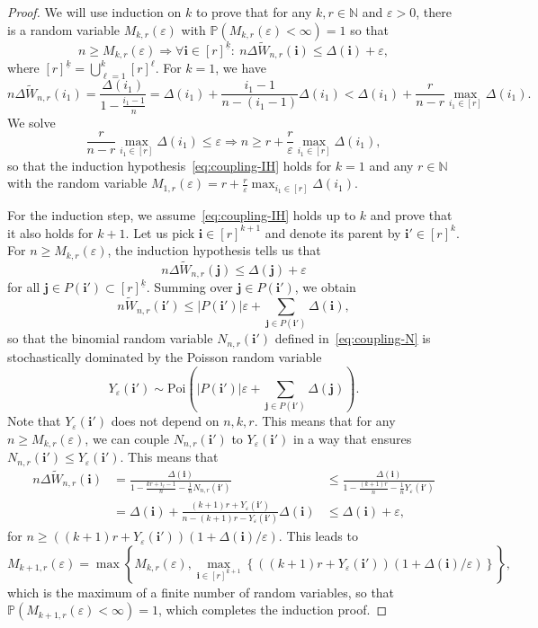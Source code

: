 \documentclass[11pt]{article}
\theoremstyle{definition}
\theoremstyle{remark}
\theoremstyle{remark}
\numberwithin{theorem}{section}
\providecommand{\P}{}
\renewcommand{\P}{\mathbb{P}}
\begin{document}
\begin{proof}
    We will use induction on $k$ to prove that for any $k,r\in\mathbb N$ and $\varepsilon>0$, there is a random variable $M_{k,r}(\varepsilon)$ with $\P(M_{k,r}(\varepsilon)<\infty)=1$ so that
    \begin{equation}\label{eq:coupling-IH}
    n\ge M_{k,r}(\varepsilon)\Rightarrow \forall \bm i\in[r]^{\underline k}:\ n\Delta \widetilde{W}_{n,r}(\bm{i})\le \Delta(\bm i)+\varepsilon,
    \end{equation}
    where $[r]^{\underline k}=\bigcup_{\ell=1}^k[r]^\ell$.
    For $k=1$, we have
    \[
    n\Delta\widetilde W_{n,r}(i_1)=\frac{\Delta(i_1)}{1-\frac{i_1-1}{n}}=\Delta(i_1)+\frac{i_1-1}{n-(i_1-1)}\Delta(i_1)<\Delta(i_1)+\frac{r}{n-r}\max_{i_1\in[r]}\Delta(i_1).
    \]
    We solve
    \[
    \frac{r}{n-r}\max_{i_1\in[r]}\Delta(i_1)\le \varepsilon\Rightarrow n\ge r+\frac r\varepsilon\max_{i_1\in[r]}\Delta(i_1),
    \]
    so that the induction hypothesis~\eqref{eq:coupling-IH} holds for $k=1$ and any $r\in\mathbb N$ with the random variable $M_{1,r}(\varepsilon)=r+\frac r\varepsilon\max_{i_1\in[r]}\Delta(i_1)$.
    
    For the induction step, we assume~\eqref{eq:coupling-IH} holds up to $k$ and prove that it also holds for $k+1$. Let us pick $\bm i\in[r]^{k+1}$ and denote its parent by $\bm i'\in [r]^k$. For $n\ge M_{k,r}(\varepsilon)$, the induction hypothesis tells us that
    \[
    n\Delta \widetilde{W}_{n,r}(\bm{j})\le \Delta(\bm j)+\varepsilon
    \]
    for all $\bm j \in P(\bm i')\subset[r]^{\underline k}$. Summing over $\bm j \in P(\bm i')$, we obtain 
    \[
    n\widetilde{W}_{n,r}(\bm{i}')\le |P(\bm i')|\varepsilon+\sum_{\bm j\in P(\bm i')}\Delta(\bm i),
    \]
    so that the binomial random variable $N_{n,r}(\bm i')$ defined in~\cref{eq:coupling-N} is stochastically dominated by the Poisson random variable
    \[
    Y_{\varepsilon}(\bm i')\sim\text{Poi}\left(|P(\bm i')|\varepsilon+\sum_{\bm j\in P(\bm i')}\Delta(\bm j)\right).
    \]
    Note that $Y_{\varepsilon}(\bm i')$ does not depend on $n,k,r$. This means that for any $n\ge M_{k,r}(\varepsilon)$, we can couple $N_{n,r}(\bm i')$ to $Y_{\varepsilon}(\bm i')$ in a way that ensures $N_{n,r}(\bm i')\le Y_{\varepsilon}(\bm i')$.
    This means that
    \begin{eqnarray*}
    n\Delta \widetilde W_{n,r}(\bm i)
    &=\frac{\Delta(\bm i)}{1-\frac{kr+i_\ell-1}n-\frac1nN_{n,r}(\bm i')}
    &\le \frac{\Delta(\bm i)}{1-\frac{(k+1)r}n-\frac1nY_{\varepsilon}(\bm i')}\\
    &=\Delta(\bm i)+\frac{(k+1)r+Y_{\varepsilon}(\bm i')}{n-(k+1)r-Y_{\varepsilon}(\bm i')}\Delta(\bm i)
    &\le\Delta(\bm i)+\varepsilon,
    \end{eqnarray*}
    for $n\ge ((k+1)r+Y_{\varepsilon}(\bm i'))(1+\Delta(\bm i)/\varepsilon)$. This leads to
    \[
    M_{k+1,r}(\varepsilon)=\max\left\{M_{k,r}(\varepsilon),\max_{\bm i\in[r]^{k+1}}\left\{((k+1)r+Y_{\varepsilon}(\bm i'))(1+\Delta(\bm i)/\varepsilon)\right\}\right\},
    \]
    which is the maximum of a finite number of random variables, so that $\P(M_{k+1,r}(\varepsilon)<\infty)=1$, which completes the induction proof. 
    

\end{proof}
\end{document}
